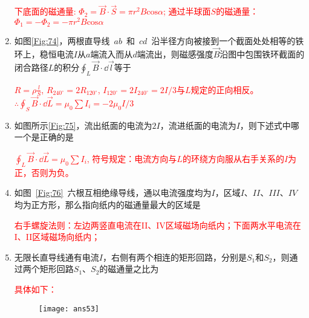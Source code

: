 \begin{enumerate}
\begin{note}
        \textcolor{red}{下底面的磁通量: $\varPhi_2=\vec{B}\cdot \vec{S}=\pi r^2 B \mathrm{cos} \alpha$; 通过半球面$S$的磁通量：$\varPhi_1=-\varPhi_2=-\pi r^2 B \mathrm{cos}\alpha$}
    \end{note}
    \item 如图\ref{Fig:74}，两根直导线~$ab$~和~$cd$~沿半径方向被接到一个截面处处相等的铁环上，稳恒电流$I$从$a$端流入而从$d$端流出，则磁感强度$\vec{B}$沿图中包围铁环截面的闭合路径$L$的积分$\oint_L \vec{B}\cdot \dd \vec{l}$等于~
    \begin{note}
        \textcolor{red}{$R=\rho\frac{l}{S}$, $R_{240^\circ}=2R_{120^\circ}$, $I_{120^\circ}=2I_{240^\circ}=2I/3$与$L$规定的正向相反。$\therefore \oint_S\vec{B}\cdot \dd \vec{L}=\mu_0 \sum I_i=-2\mu_0 I /3$}
    \end{note}
    \item 如图所示\ref{Fig:75}，流出纸面的电流为$2I$，流进纸面的电流为$I$，则下述式中哪一个是正确的是~
    \begin{note}
        \textcolor{red}{$\oint_L \vec{B}\cdot \dd \vec{L}=\mu_0 \sum I_i$, 符号规定：电流方向与$L$的环绕方向服从右手关系的$I$为正，否则为负。}
    \end{note}
    \item 如图~\ref{Fig:76}~六根互相绝缘导线，通以电流强度均为$I$，区域$I$、$II$、$III$、$IV$均为正方形，那么指向纸内的磁通量最大的区域是~
    \begin{note}
        \textcolor{red}{右手螺旋法则：左边两竖直电流在II、IV区域磁场向纸内；下面两水平电流在I、II区域磁场向纸内； }
    \end{note}
    \item 无限长直导线通有电流$I$，右侧有两个相连的矩形回路，分别是$S_1$和$S_2$，则通过两个矩形回路$S_1$、$S_2$的磁通量之比为~
    \begin{note}
        \textcolor{red}{具体如下：}
        \begin{figure}[H]
            \centering
            \texttt{[image: ans53]}
        \end{figure}
    \end{note}
\end{enumerate}

